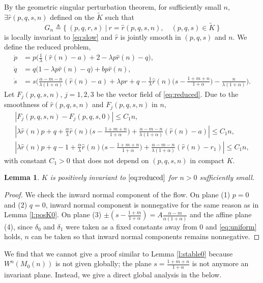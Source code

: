 \documentclass[a4paper,11pt]{article}
\newtheorem{lemma}{Lemma}[section]
\begin{document}
{By the geometric singular perturbation theorem, for sufficiently small $n$, $\exists \hat{r}(p,q,s,n)$ defined on the $\tilde{K}$ such that
$$G_n\triangleq \{\:(p,q,r,s)\: | \: r=\hat{r}(p,q,s,n), \quad (p,q,s)\in \tilde{K}\:\}$$
is locally invariant to \eqref{eq:slow} and $\hat{r}$ is jointly smooth in $(p,q,s)$ and $n$.
We define the reduced problem,
\begin{equation} \label{eq:reduced}
 \begin{aligned}
 \dot{p} &=p\Big(\frac{1}{\lambda}(\hat{r}(n)-a) + 2- \lambda p \hat{r}(n) -q\Big),\\
 \dot{q} &=q\Big(1 -\lambda p \hat{r}(n) -q\Big) + b p \hat{r}(n),\\
 \dot{s} &=s\Big(\frac{\alpha-m-n}{\lambda(1+\alpha)}(\hat{r}(n)-a) + \lambda pr + q - \frac{1}{\lambda}\hat{r}(n)\big(s- \frac{1+m+n}{1+\alpha}\big) - \frac{n}{\lambda(1+\alpha)}\Big).
 \end{aligned}
\end{equation}
Let $F_j(p,q,s,n)$, $j=1,2,3$ be the vector field of \eqref{eq:reduced}.
Due to the smoothness of $\hat{r}(p,q,s,n)$ and $F_j(p,q,s,n)$ in $n$, 
\begin{equation} \label{eq:uniform}
 \begin{aligned}
\left|F_j(p,q,s,n) - F_j(p,q,s,0)\right| \le C_1n,\\
 \left|\lambda \hat{r}(n)p + q +\frac{\alpha}{\lambda}\hat{r}(n)\big(s- \frac{1+m+n}{1+\alpha}\big) + \frac{\alpha-m-n}{\lambda(1+\alpha)}(\hat{r}(n)-a)\right| \le C_1n,\\
 \left|\lambda \hat{r}(n)p + q-1 +\frac{\alpha}{\lambda}\hat{r}(n)\big(s- \frac{1+m+n}{1+\alpha}\big) + \frac{\alpha-m-n}{\lambda(1+\alpha)}(\hat{r}(n)-r_1)\right| \le C_1n,
 \end{aligned}
\end{equation}
with constant $C_1>0$ that does not depend on $(p,q,s,n)$ in compact $K$.


\begin{lemma} $K$ is positively invariant to $\eqref{eq:reduced}$ for $n>0$ sufficiently small. \label{l:posK}
\end{lemma}
\begin{proof}
We check the inward normal component of the flow.
 On plane (1) $p=0$ and (2) $q=0$, inward normal component is nonnegative for the same reason as in Lemma \ref{l:posK0}. On plane (3) $\pm\left(s-\frac{1+m}{1+\alpha}\right) = A \frac{\alpha-m}{\alpha(1+\alpha)}$ and the affine plane (4), since $\delta_0$ and $\delta_1$ were taken as a  fixed constants away from $0$ and \eqref{eq:uniform} holds, $n$ can be taken so that inward normal components remains nonnegative.
\end{proof}
We find that we cannot give a proof similar to Lemma \ref{l:stable0} because $W^u(M_0(n))$ is not given globally; the plane $s = \frac{1+m+n}{1+\alpha}$ is not anymore an invariant plane. Instead, we give a direct global analysis in the below. %

}
\end{document}
